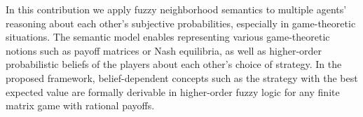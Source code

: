 
In this contribution we apply fuzzy neighborhood semantics to multiple agents' reasoning about each other's subjective probabilities, especially in game-theoretic situations. The semantic model enables representing various game-theoretic notions such as payoff matrices or Nash equilibria, as well as higher-order probabilistic beliefs of the players about each other's choice of strategy. In the proposed framework, belief-dependent concepts such as the strategy with the best expected value are formally derivable in higher-order fuzzy logic for any finite matrix game with rational payoffs.


